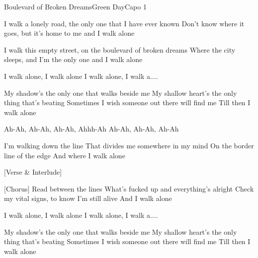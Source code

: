 \begin{song}{Boulevard of Broken Dreams}{Green Day}{Capo 1}

I walk a lonely road, the only one that I have ever known
Don't know where it goes, but it's home to me and I walk alone


I walk this empty street, on the boulevard of broken dreams
Where the city sleeps, and I'm the only one and I walk alone

          I walk alone, I walk alone
          I walk alone, I walk a....

My shadow's the only one that walks beside me
My shallow heart's the only thing that's beating
Sometimes I wish someone out there will find me
Till then I walk alone

  Ah-Ah, Ah-Ah, Ah-Ah, Ahhh-Ah
Ah-Ah, Ah-Ah, Ah-Ah

I'm walking down the line
That divides me somewhere in my mind
On the border line of the edge
And where I walk alone

[Verse & Interlude]

[Chorus]
Read between the lines
What's fucked up and everything's alright
Check my vital signs, to know I'm still alive
And I walk alone

          I walk alone, I walk alone
          I walk alone, I walk a....

My shadow's the only one that walks beside me
My shallow heart's the only thing that's beating
Sometimes I wish someone out there will find me
Till then I walk alone


\end{song}
